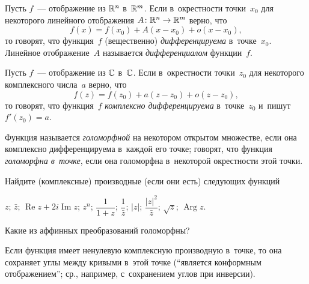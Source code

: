 \documentclass[a4paper, 12pt]{article}
\begin{document}


%
Пусть $f$~--- отображение из $\mathbb{R}^n$ в~$\mathbb{R}^m$.
Если в~окрестности точки~$x_0$ для некоторого линейного отображения $A\colon\mathbb{R}^n\rightarrow\mathbb{R}^m$ верно, что
\[
f(x)=f(x_0)+A(x-x_0)+o(x-x_0),
\]
то говорят, что функция~$f$ (вещественно) \emph{дифференцируема} в~точке~$x_0$. Линейное отображение~$A$ называется \emph{дифференциалом} функции~$f$.






Пусть $f$~--- отображение из $\mathbb{C}$ в~$\mathbb{C}$.
Если в~окрестности точки~$z_0$ для некоторого комплексного числа~$a$ верно, что
\[
f(z)=f(z_0)+a(z-z_0)+o(z-z_0),
\]
то говорят, что функция~$f$ \emph{комплексно дифференцируема} в~точке~$z_0$ и~пишут $f'(z_0)=a$.

Функция называется \emph{голоморфной} на некотором открытом множестве, если она комплексно дифференцируема в~каждой его точке; говорят, что функция \emph{голоморфна в~точке}, если она голоморфна в~некоторой окрестности этой точки.




Найдите (комплексные) производные (если они есть) следующих функций

 $z$;\quad
{} $\bar z$;\quad
{} $\operatorname{Re}z+2i\operatorname{Im}z$;\quad
{} $z^n$;\quad
{} $\dfrac1{1+z}$;\quad
{} $\dfrac1{\bar z}$;\quad
{} $|z|$;\quad
{} $\dfrac{|z|^2}{\bar z}$;\quad
{} $\sqrt z$;\quad
{} $\operatorname{Arg}z$.






Какие из аффинных преобразований голоморфны?






Если функция имеет ненулевую комплексную производную в~точке, то она сохраняет углы между кривыми в~этой точке (``является конформным отображением''; ср., например, с~сохранением углов при инверсии).
\end{document}
